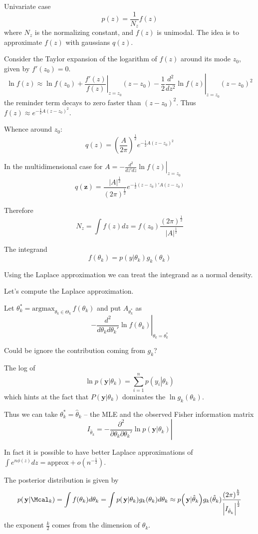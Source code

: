 \documentclass[a4paper]{article}
\newcommand{\brac}[1]{{\left ( #1 \right )}}
\newcommand{\induc}[1]{{\left . #1 \right \vert}}
\newcommand{\abs}[1]{{\left | #1 \right |}}
\begin{document}
Univariate case
\[p(z) = \frac{1}{N_z}f(z)\]
where $N_z$ is the normalizing constant, and $f(z)$ is unimodal.
The idea is to approximate $f(z)$ with gaussians $q(z)$.

Consider the Taylor expansion of the logarithm of $f(z)$ around its mode $z_0$, given by $f'(z_0) = 0$.
\[\ln f(z) \approx \ln f(z_0) + \induc{\frac{f'(z)}{f(z)}}_{z=z_0} (z-z_0) - \frac{1}{2} \induc{\frac{d^2}{dz^2} \ln f(z)}_{z=z_0} \brac{z-z_0}^2 \]
the reminder term decays to zero faster than $\brac{z-z_0}^2$. Thus $f(z)\approx e^{ -\frac{1}{2} A {(z-z_0)}^2 }$.

Whence around $z_0$:
\[q(z) = \brac{\frac{A}{2\pi}}^\frac{1}{2}e^{ -\frac{1}{2} A {(z-z_0)}^2 }\]

In the multidimensional case for $A = \induc{-\frac{d^2}{dz'dz}\ln f(z)}_{z=z_0}$
\[q(\mathbf{z}) = \frac{\abs{A}^\frac{1}{2}}{{(2\pi)}^\frac{1}{2}} e^{-\frac{1}{2} (z-z_0)'A(z-z_0)}\]

Therefore
\[N_z = \int f(z) dz = f(z_0) \frac{{(2\pi)}^\frac{1}{2}}{\abs{A}^\frac{1}{2}}\]


The integrand
\[f(\theta_k) = p\brac{\induc{y}\theta_k}g_k(\theta_k)\]

Using the Laplace approximation we can treat the integrand as a normal density.

Let's compute the Laplace approximation.

Let $\theta_k^* = \text{argmax}_{\theta_k\in \Theta_k}\,f(\theta_k)$ and put $A_{\theta_k^*}$ as
\[\induc{- \frac{d^2}{d\theta_kd\theta_k'} \ln f(\theta_k)}_{\theta_k=\theta_k^*}\]

Could be ignore the contribution coming from $g_k$?

The log of
\[\ln p\brac{\induc{\mathbf{y}}\theta_k} = \sum_{i=1}^n p\brac{\induc{y_i}\theta_k}\]
which hints at the fact that $P\brac{\induc{\mathbf{y}}\theta_k}$ dominates the $\ln g_k(\theta_k)$.

Thus we can take $\theta_k^* = \hat{\theta}_k$ -- the MLE and the observed Fisher information matrix
\[I_{\hat{\theta}_k} = \induc{- \frac{\partial^2}{\partial\theta_k \partial\theta_k'}\ln p\brac{\induc{\mathbf{y}} \theta_k}} \]

In fact it is possible to have better Laplace approximations of $\int e^{n\phi(z)}dz = \text{approx} + o(n^{-\frac{1}{2}})$.

The posterior distribution is given by 
\[p\brac{\induc{\mathbf{y}}\Mcal_k} = \int f(\theta_k) d \theta_k = \int p\brac{\induc{\mathbf{y}}\theta_k} g_k(\theta_k) d \theta_k \approx p\brac{\induc{\mathbf{y}}\hat{\theta}_k} g_k(\hat{\theta}_k) \frac{\brac{2\pi}^\frac{k}{2}}{\abs{I_{\hat{\theta}_k}}^\frac{1}{2}}\]
the exponent $\frac{k}{2}$ comes from the dimension of $\theta_k$.
\end{document}
